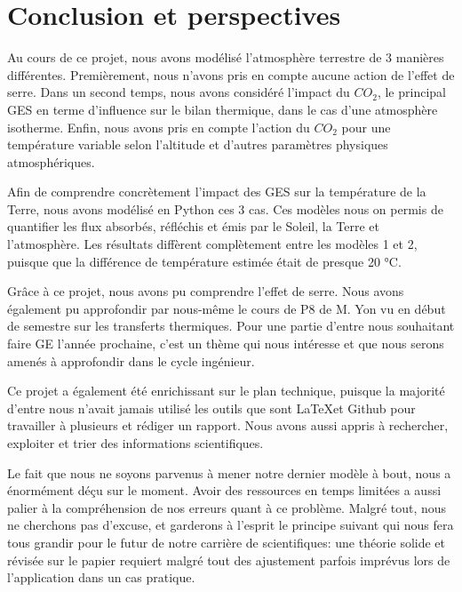 \documentclass[a4paper, 12pt]{report} %
\begin{document}
\chapter*{Conclusion et perspectives}

    Au cours de ce projet, nous avons modélisé l'atmosphère terrestre
de 3 manières différentes. Premièrement, nous n'avons pris en compte aucune action de l'effet de serre. Dans un second temps, nous avons considéré l'impact du $CO_2$, le principal GES en terme d'influence sur le bilan thermique, dans le cas d'une atmosphère isotherme. Enfin, nous avons pris en compte l'action du $CO_2$ pour une température variable selon l'altitude et d'autres paramètres physiques atmosphériques. \vspace{\baselineskip}

    Afin de comprendre concrètement l'impact des GES
sur la température de la Terre, nous avons modélisé en Python ces 3 cas. Ces modèles nous on permis de quantifier les flux absorbés, réfléchis et émis par le Soleil, la Terre et l'atmosphère.
Les résultats diffèrent complètement entre les modèles 1 et 2, puisque que la différence de température estimée était de presque 20 °C.
\vspace{\baselineskip}

    Grâce à ce projet, nous avons pu comprendre l'effet de serre. Nous
avons également pu approfondir par nous-même le cours de P8 de M. Yon vu en début de semestre sur les transferts thermiques. Pour une partie d'entre nous souhaitant faire GE l'année prochaine, c'est un thème qui nous intéresse et que nous serons amenés à approfondir dans le cycle ingénieur. \vspace{\baselineskip}

    Ce projet a également été enrichissant sur le plan technique,
puisque la majorité d'entre nous n'avait jamais utilisé les outils que sont \LaTeX et Github pour travailler à plusieurs et rédiger un rapport. Nous avons aussi appris à rechercher, exploiter et trier des informations scientifiques. \vspace{\baselineskip}

    Le fait que nous ne soyons parvenus à mener notre dernier modèle à
bout, nous a énormément déçu sur le moment. Avoir des ressources en temps limitées a aussi palier à la compréhension de nos erreurs quant à ce problème. Malgré tout, nous ne cherchons pas d'excuse, et garderons à l'esprit le principe suivant qui nous fera tous grandir pour le futur de notre carrière de scientifiques: une théorie solide et révisée sur le papier requiert malgré tout des ajustement parfois imprévus lors de l'application dans un cas pratique. \vspace{\baselineskip}
\end{document}

